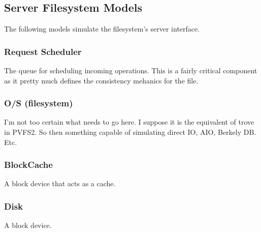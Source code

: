 \documentclass[11pt]{article}
\begin{document}
\subsection{Server Filesystem Models}
The following models simulate the filesystem's server interface.

\subsubsection{Request Scheduler}
The queue for scheduling incoming operations.  This is a fairly critical
component as it pretty much defines the consistency mehanics for the file.

\subsubsection{O/S (filesystem)}
I'm not too certain what needs to go here.  I suppose it is the equivalent of
trove in PVFS2.  So then something capable of simulating direct IO, AIO,
Berkely DB.  Etc.

\subsubsection{BlockCache}
A block device that acts as a cache.

\subsubsection{Disk}
A block device.
\end{document}
